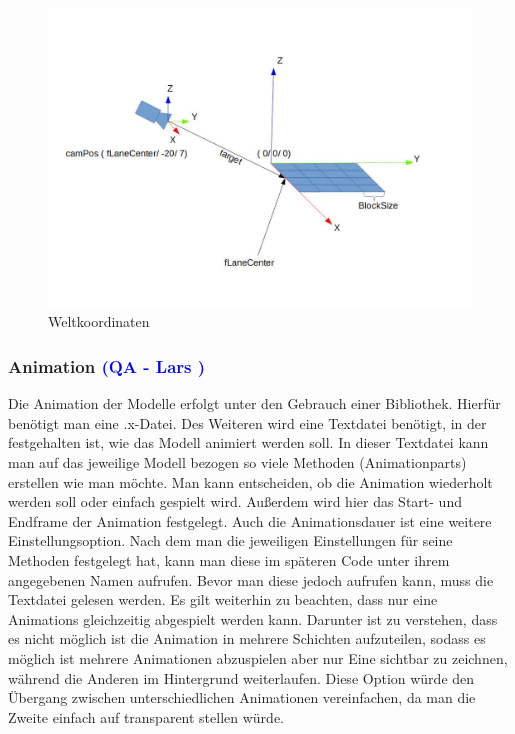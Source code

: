 \documentclass[12pt]{article}
\begin{document}
\begin{figure}
	\centering
	\includegraphics[width=1\textwidth]{Weltkoordinaten}
	\caption{Weltkoordinaten
		\label{fig:coordinates}}
\end{figure}

\vspace{1cm}
\subsubsection{Animation \textcolor{blue}{(QA - Lars )}}
Die Animation der Modelle erfolgt unter den Gebrauch einer Bibliothek. Hierfür benötigt man eine .x-Datei.
Des Weiteren wird eine Textdatei benötigt, in der festgehalten ist, wie das Modell animiert werden soll.
In dieser Textdatei kann man auf das jeweilige Modell bezogen so viele Methoden (Animationparts) erstellen
wie man möchte. Man kann entscheiden, ob die Animation wiederholt werden soll oder einfach gespielt wird.
Außerdem wird hier das Start- und Endframe der Animation festgelegt. Auch die Animationsdauer ist eine weitere
Einstellungsoption. Nach dem man die jeweiligen Einstellungen für seine Methoden festgelegt hat, kann man diese
im späteren Code unter ihrem angegebenen Namen aufrufen. Bevor man diese jedoch aufrufen kann, muss die
Textdatei gelesen werden. Es gilt weiterhin zu beachten, dass nur eine Animations gleichzeitig abgespielt werden kann.
Darunter ist zu verstehen, dass es nicht möglich ist die Animation in mehrere Schichten aufzuteilen, sodass es möglich ist
mehrere Animationen abzuspielen aber nur Eine sichtbar zu zeichnen, während die Anderen im Hintergrund weiterlaufen.
Diese Option würde den Übergang zwischen unterschiedlichen Animationen vereinfachen, da man die Zweite einfach auf
transparent stellen würde.
\end{document}
